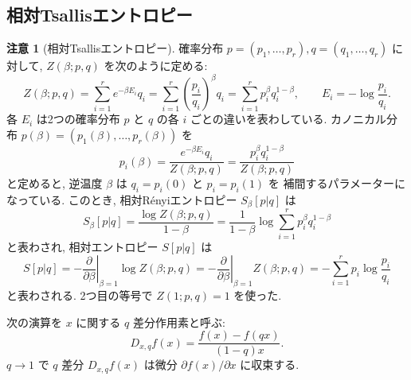 \documentclass[12pt,twoside]{jarticle}
\renewcommand\d{\partial}
\theoremstyle{definition} %
\theoremstyle{definition} %
\theoremstyle{definition} %
\newtheorem{remark}[theorem]{注意}
\numberwithin{theorem}{section}
\numberwithin{equation}{section}
\numberwithin{figure}{section}
\numberwithin{table}{section}
\begin{document}

\subsection{相対Tsallisエントロピー}
\label{sec:Tsallis}

\begin{remark}[相対Tsallisエントロピー]
\label{remark:Tsallis}
確率分布 $p=(p_1,\ldots,p_r),q=(q_1,\ldots,q_r)$ に対して, 
$Z(\beta;p,q)$ を次のように定める:
\[
Z(\beta;p,q) 
= \sum_{i=1}^r e^{-\beta E_i} q_i
= \sum_{i=1}^r \left(\frac{p_i}{q_i}\right)^\beta q_i
= \sum_{i=1}^r p_i^\beta q_i^{1-\beta},
\qquad
E_i = -\log\frac{p_i}{q_i}.
\]
各 $E_i$ は2つの確率分布 $p$ と $q$ の各 $i$ ごとの違いを表わしている.
カノニカル分布 $p(\beta)=(p_1(\beta),\ldots,p_r(\beta))$ を
\[
p_i(\beta)
=\frac{e^{-\beta E_i}q_i}{Z(\beta;p,q)}
=\frac{p_i^\beta q_i^{1-\beta}}{Z(\beta;p,q)}
\]
と定めると, 逆温度 $\beta$ は $q_i=p_i(0)$ と $p_i=p_i(1)$ を
補間するパラメーターになっている.
このとき, 相対R\'enyiエントロピー $S_\beta[p|q]$ は
\[
S_\beta[p|q]
=\frac{\log Z(\beta;p,q)}{1-\beta}
=\frac{1}{1-\beta}\log\sum_{i=1}^r p_i^\beta q_i^{1-\beta}
\]
と表わされ, 相対エントロピー $S[p|q]$ は 
\[
S[p|q]
=-\left.\frac{\d}{\d\beta}\right|_{\beta=1} \log Z(\beta;p,q) 
=-\left.\frac{\d}{\d\beta}\right|_{\beta=1} Z(\beta;p,q) 
=-\sum_{i=1}^r p_i\log\frac{p_i}{q_i}
\]
と表わされる. 2つ目の等号で $Z(1;p,q)=1$ を使った.

次の演算を $x$ に関する $q$ 差分作用素と呼ぶ:
\[
D_{x,q}f(x) = \frac{f(x)-f(qx)}{(1-q)x}.
\]
$q\to 1$ で $q$ 差分 $D_{x,q}f(x)$ は微分 $\d f(x)/\d x$ に収束する.


\end{remark}
\end{document}
